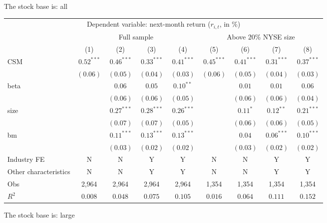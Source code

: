 \documentclass[
]{article}
\author{}
\date{\vspace{-2.5em}}
\begin{document}
The stock base is: all

\begin{tabular}{lcccccccc}
  \hline \multicolumn{9}{c}{Dependent variable: next-month return ($r_{i,t}$, in \%)} \\
 \cmidrule(l){2-9}  & \multicolumn{4}{c}{Full sample} & \multicolumn{4}{c}{Above 20\% NYSE size} \\
 \cmidrule(l){2-5} \cmidrule(l){6-9}  \vspace{5pt} & (1) & (2) & (3) & (4) & (5) & (6) & (7) & (8) \\ 
  CSM & $0.52^{***}$ & $0.46^{***}$ & $0.33^{***}$ & $0.41^{***}$ & $0.45^{***}$ & $0.41^{***}$ & $0.31^{***}$ & $0.37^{***}$ \\ 
   & $(0.06)$ & $(0.05)$ & $(0.04)$ & $(0.03)$ & $(0.06)$ & $(0.05)$ & $(0.04)$ & $(0.03)$ \\ 
  beta &  & $0.06$ & $0.05$ & $0.10^{**}$ &  & $0.01$ & $0.01$ & $0.06$ \\ 
   &  & $(0.06)$ & $(0.06)$ & $(0.05)$ &  & $(0.06)$ & $(0.06)$ & $(0.04)$ \\ 
  size &  & $0.27^{***}$ & $0.28^{***}$ & $0.26^{***}$ &  & $0.11^{*}$ & $0.12^{**}$ & $0.21^{***}$ \\ 
   &  & $(0.07)$ & $(0.07)$ & $(0.05)$ &  & $(0.06)$ & $(0.06)$ & $(0.05)$ \\ 
  bm &  & $0.11^{***}$ & $0.13^{***}$ & $0.13^{***}$ &  & $0.04$ & $0.06^{***}$ & $0.10^{***}$ \\ 
   \vspace{5pt} &  & $(0.03)$ & $(0.02)$ & $(0.02)$ &  & $(0.03)$ & $(0.02)$ & $(0.02)$ \\ 
  Industry FE & N & N & Y & Y & N & N & Y & Y \\ 
   \vspace{5pt}Other characteristics & N & N & Y & Y & N & N & Y & Y \\ 
  Obs & 2,964 & 2,964 & 2,964 & 2,964 & 1,354 & 1,354 & 1,354 & 1,354 \\ 
  $R^2$ & $0.008$ & $0.048$ & $0.075$ & $0.105$ & $0.016$ & $0.064$ & $0.111$ & $0.152$ \\ 
   \bottomrule\end{tabular}

The stock base is: large
\end{document}
